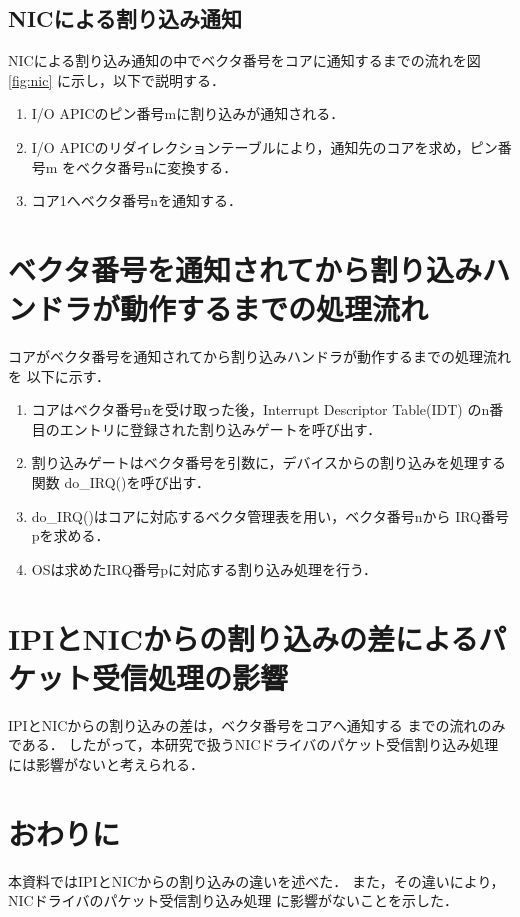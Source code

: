 \documentclass[12pt]{jsarticle}
\begin{document}
        \subsection{NICによる割り込み通知}\label{nic}
        NICによる割り込み通知の中でベクタ番号をコアに通知するまでの流れを図\ref{fig:nic}
        に示し，以下で説明する．
        \begin{enumerate}
            \item I/O APICのピン番号mに割り込みが通知される．
            \item I/O APICのリダイレクションテーブルにより，通知先のコアを求め，ピン番号m
                をベクタ番号nに変換する．
            \item コア1へベクタ番号nを通知する．
        \end{enumerate}
\section{ベクタ番号を通知されてから割り込みハンドラが動作するまでの処理流れ}
コアがベクタ番号を通知されてから割り込みハンドラが動作するまでの処理流れを
以下に示す．
\begin{enumerate}
    \item
        コアはベクタ番号nを受け取った後，Interrupt Descriptor Table(IDT) 
        のn番目のエントリに登録された割り込みゲートを呼び出す．
    \item 
        割り込みゲートはベクタ番号を引数に，デバイスからの割り込みを処理する
        関数 do\_IRQ()を呼び出す．
    \item 
        do\_IRQ()はコアに対応するベクタ管理表を用い，ベクタ番号nから
        IRQ番号pを求める．
    \item
        OSは求めたIRQ番号pに対応する割り込み処理を行う．
\end{enumerate}
\section{IPIとNICからの割り込みの差によるパケット受信処理の影響}
IPIとNICからの割り込みの差は，ベクタ番号をコアへ通知する
までの流れのみである．
したがって，本研究で扱うNICドライバのパケット受信割り込み処理
には影響がないと考えられる．
\section{おわりに}
本資料ではIPIとNICからの割り込みの違いを述べた．
また，その違いにより，NICドライバのパケット受信割り込み処理
に影響がないことを示した．
\end{document}
